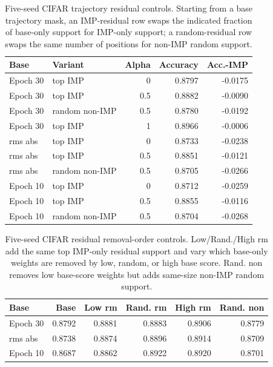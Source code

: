 \begin{table}[t]
\centering
\small
\setlength{\tabcolsep}{4pt}
\begin{tabular}{llrrr}
\toprule
Base & Variant & Alpha & Accuracy & Acc.-IMP \\
\midrule
Epoch 30 & top IMP & 0 & 0.8797 & -0.0175 \\
Epoch 30 & top IMP & 0.5 & 0.8882 & -0.0090 \\
Epoch 30 & random non-IMP & 0.5 & 0.8780 & -0.0192 \\
Epoch 30 & top IMP & 1 & 0.8966 & -0.0006 \\
rms abs & top IMP & 0 & 0.8733 & -0.0238 \\
rms abs & top IMP & 0.5 & 0.8851 & -0.0121 \\
rms abs & random non-IMP & 0.5 & 0.8705 & -0.0266 \\
Epoch 10 & top IMP & 0 & 0.8712 & -0.0259 \\
Epoch 10 & top IMP & 0.5 & 0.8855 & -0.0116 \\
Epoch 10 & random non-IMP & 0.5 & 0.8704 & -0.0268 \\
\bottomrule
\end{tabular}
\caption{Five-seed CIFAR trajectory residual controls. Starting from a base trajectory mask, an IMP-residual row swaps the indicated fraction of base-only support for IMP-only support; a random-residual row swaps the same number of positions for non-IMP random support.}
\label{tab:cifar-trajectory-residual}
\end{table}

\begin{table}[t]
\centering
\small
\setlength{\tabcolsep}{3pt}
\begin{tabular}{lrrrrr}
\toprule
Base & Base & Low rm & Rand. rm & High rm & Rand. non \\
\midrule
Epoch 30 & 0.8792 & 0.8881 & 0.8883 & 0.8906 & 0.8779 \\
rms abs & 0.8738 & 0.8874 & 0.8896 & 0.8914 & 0.8709 \\
Epoch 10 & 0.8687 & 0.8862 & 0.8922 & 0.8920 & 0.8701 \\
\bottomrule
\end{tabular}
\caption{Five-seed CIFAR residual removal-order controls. Low/Rand./High rm add the same top IMP-only residual support and vary which base-only weights are removed by low, random, or high base score. Rand. non removes low base-score weights but adds same-size non-IMP random support.}
\label{tab:cifar-residual-removal-controls}
\end{table}

